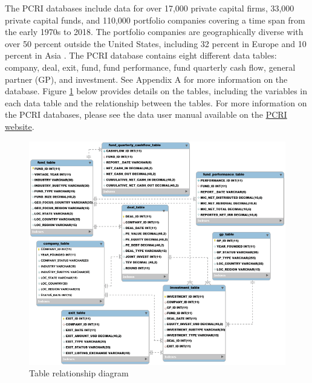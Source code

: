 \documentclass[
]{book}
\begin{document}
The PCRI databases include data for over 17,000 private capital firms, 33,000 private capital funds, and 110,000 portfolio companies covering a time span from the early 1970s to 2018. The portfolio companies are geographically diverse with over 50 percent outside the United States, including 32 percent in Europe and 10 percent in Asia \citep{jeng2015}. The PCRI database contains eight different data tables: company, deal, exit, fund, fund performance, fund quarterly cash flow, general partner (GP), and investment. See Appendix A for more information on the database. Figure \ref{fig:pcrifigure2} below provides details on the tables, including the variables in each data table and the relationship between the tables. For more information on the PCRI databases, please see the data user manual available on the \href{http://privatecapitalresearchinstitute.org/images/news/pcri_manual_2_4.pdf}{PCRI website}.

\begin{figure}
\includegraphics[width=1\linewidth]{./assets/pcri/pcrifigure2web} \caption{Table relationship diagram}\label{fig:pcrifigure2}
\end{figure}
\end{document}
